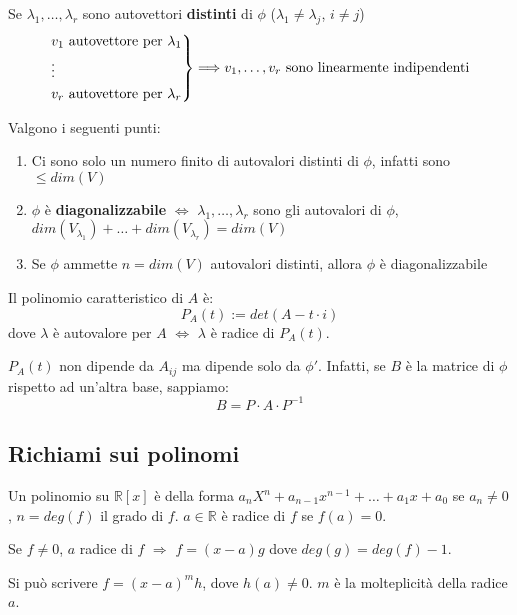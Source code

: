 \begin{proposition}
	Se $\lambda_{1}, \ldots, \lambda_{r}$ sono autovettori \textbf{distinti} di $\phi$ ($\lambda_{1} \neq \lambda_j$, $i \neq j$)
	\begin{equation*}
		\begin{rcases}
			v_1 \text{ autovettore per } \lambda_{1} \\
			\vdots \\
			v_r \text{ autovettore per } \lambda_{r} \\
		\end{rcases} \Longrightarrow v_1, \ldots, v_r \text{ sono linearmente indipendenti}
	\end{equation*}
\end{proposition}

\begin{corollary}Valgono i seguenti punti:
	\begin{enumerate}
		\item Ci sono solo un numero finito di autovalori distinti di $\phi$, infatti sono $\leq dim(V)$
		\item $\phi$ è \textbf{diagonalizzabile} $\Longleftrightarrow$ $\lambda_1, \ldots, \lambda_r$ sono gli autovalori di $\phi$, $dim(V_{\lambda_{1}}) + \ldots + dim(V_{\lambda_r}) = dim(V)$
		\item Se $\phi$ ammette $n = dim(V)$ autovalori distinti, allora $\phi$ è diagonalizzabile
 	\end{enumerate}
\end{corollary}

\begin{definition}
	Il polinomio caratteristico di $A$ è:
	\begin{equation*}
		P_A(t) := det(A-t \cdot i)
	\end{equation*}
	dove $\lambda$ è autovalore per $A$ $\Longleftrightarrow$ $\lambda$ è radice di $P_A(t)$.
\end{definition}

\begin{observation}
	$P_A(t)$ non dipende da $A_{ij}$ ma dipende solo da $\phi'$. Infatti, se $B$ è la matrice di $\phi$ rispetto ad un'altra base, sappiamo:
	\begin{equation*}
		B = P \cdot A \cdot P^{-1}
	\end{equation*}
\end{observation}

\subsection{Richiami sui polinomi}
Un polinomio su $\mathbb{R}[x]$ è della forma $a_nX^n + a_{n-1}x^{n-1}+\ldots+a_1 x + a_0$ se $a_n \neq 0$, $n = deg(f)$ il grado di $f$. $a \in \mathbb{R}$ è radice di $f$ se $f(a) = 0$.
\begin{proposition}
	Se $f \neq 0$, $a$ radice di $f$ $\Longrightarrow$ $f = (x-a)g$ dove $deg(g) = deg(f)-1$.
\end{proposition}
\begin{corollary}
	Si può scrivere $f=(x-a)^m h$, dove $h(a) \neq 0$. $m$ è la molteplicità della radice $a$.
\end{corollary}

